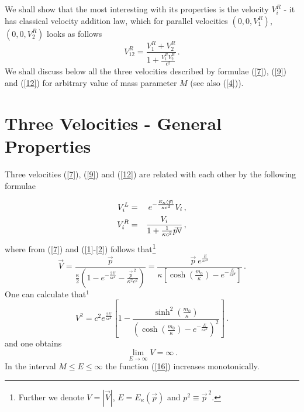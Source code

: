 \documentclass[a4paper,12pt]{article}
\begin{document}
We shall show that the most interesting with its properties is the
velocity $V_i^R$ - it has classical velocity addition law, which
for parallel velocities $(0,0,V^R_1)$, $(0,0,V^R_2)$ looks as
follows
\begin{equation}\label{13}
V^{R}_{12}=  \frac{V^{R}_{1}+ V^{R}_{2}}{1 +
\frac{V^{R}_{1}V^{R}_{2}}{c^2}}\, .
\end{equation}
We shall discuss below all the three velocities described by
formulae (\ref{7}), (\ref{9}) and (\ref{12}) for arbitrary value
of mass parameter $M$ (see also (\ref{4})).

\section{Three Velocities - General Properties}


Three velocities (\ref{7}), (\ref{9}) and (\ref{12}) are related
with each other by the following formulae

\renewcommand{\theequation}{14\alph{equation}}
\setcounter{equation}{0}
\begin{eqnarray}\label{14a}
  V^{L}_{i} & = & e^{- \frac{E_{\kappa} (\vec{p} )}{\kappa c^3}} V_i\, ,
\\
\label{14b} V^R_i &= & \frac{V_i}{1+ \frac{1}{\kappa c^2} \vec{p}
\vec{\rm v}}\, ,
\end{eqnarray}
\renewcommand{\theequation}{\arabic{equation}}
\setcounter{equation}{14} where from (\ref{7}) and
(\ref{1}-\ref{2}) follows that\footnote{Further we denote $V=|
\vec{V}|$, $E=E_\kappa ( \vec{p})$ and $p^2 \equiv \vec{p}^{\ 2}
$.}
\begin{equation}\label{15}
  \vec{V} = \frac{\vec{p}}{ \frac{\kappa}{2} \left( 1 - e^{- \frac{2E}{\kappa c^2}} -
\frac{\vec{p}^{\ 2}}{\kappa^2 c^2} \right)} = \frac{\vec{p} \ e^\frac{E}{\kappa
c^2}}{\kappa\left[\cosh(\frac{m_0}{\kappa}) - e^{-\frac{E}{\kappa
c^2}}\right]}\, .
\end{equation}
One can calculate that$^{1}$
\begin{equation}\label{16}
V^2 = c^2 e^\frac{2E}{\kappa c^2}\left[1 -
\frac{\sinh^2(\frac{m_0}{\kappa})}{\left(\cosh (\frac{m_0}{\kappa}) -
e^{-\frac{E}{\kappa c^2}}\right)^2}\right]\,.
\end{equation}
and one obtains
\begin{equation}\label{17}
  \lim\limits_{E\to \infty} V  = \infty \, .
\end{equation}
In the interval  $M\leq E\leq \infty$ the function (\ref{16})
increases monotonically.
\end{document}
